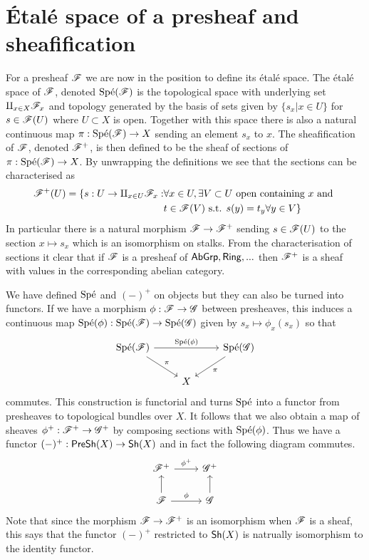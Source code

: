 \documentclass{memoir}
\begin{document}
\section{\'Etal\'e space of a presheaf and sheafification}
For a presheaf $\mathscr{F}$ we are now in the position to define its \'etal\'e space.
The \'etal\'e space of $\mathscr{F}$, denoted $\text{Sp\'e}(\mathscr{F})$ is the topological space with underlying set $\amalg_{x\in X}\mathscr{F}_x$ and topology generated by the basis of sets given by $\{s_x|x\in U\}$ for $s\in \mathscr{F}(U)$ where $U\subset X$ is open.
Together with this space there is also a natural continuous map $\pi:\text{Sp\'e}(\mathscr{F})\to X$ sending an element $s_x$ to $x$.
The sheafification of $\mathscr{F}$, denoted $\mathscr{F}^+$, is then defined to be the sheaf of sections of $\pi:\text{Sp\'e}(\mathscr{F})\to X$.
By unwrapping the definitions we see that the sections can be characterised as
\begin{align}
    \mathscr{F}^+(U) = \{s:U\to\amalg_{x\in U}\mathscr{F}_x : & \forall x\in U, \exists V\subset U \text{ open containing $x$ and } \nonumber \\
                                                            & t\in\mathscr{F}(V) \text{ s.t. }  s(y) = t_y \forall y\in V\}
\end{align}
In particular there is a natural morphism $\mathscr{F} \to \mathscr{F}^+$ sending $s\in \mathscr{F}(U)$ to the section $x\mapsto s_x$ which is an isomorphism on stalks.
From the characterisation of sections it clear that if $\mathscr{F}$ is a presheaf of ${\normalfont\mathsf{AbGrp}},{\normalfont\mathsf{Ring}},...$ then $\mathscr{F}^+$ is a sheaf with values in the corresponding abelian category.

We have defined $\text{Sp\'e}$ and $(-)^+$ on objects but they can also be turned into functors.
If we have a morphism $\phi:\mathscr{F}\to\mathscr{G}$ between presheaves, this induces a continuous map $\text{Sp\'e}(\phi):\text{Sp\'e}(\mathscr{F})\to \text{Sp\'e}(\mathscr{G})$ given by $s_x\mapsto\phi_x(s_x)$ so that 
\begin{equation}
    \begin{tikzcd}
        \Spe(\shf{F}) \arrow[rr, "\Spe(\phi)"] \arrow[rd,"\pi"] & & \Spe(\shf{G}) \arrow[dl,"\pi"] \\
                                              & X &
    \end{tikzcd}
\end{equation}
commutes.
This construction is functorial and turns $\text{Sp\'e}$ into a functor from presheaves to topological bundles over $X$.
It follows that we also obtain a map of sheaves $\phi^+:\mathscr{F}^+\to\mathscr{G}^+$ by composing sections with $\text{Sp\'e}(\phi)$.
Thus we have a functor $(-)^+:{\normalfont\mathsf{PreSh}}(X)\to{\normalfont\mathsf{Sh}}(X)$ and in fact the following diagram commutes.
\begin{equation}
    \label{eq:sheafif}
    \begin{tikzcd}
        \shf{F}^+ \arrow[r,"\phi^+"] & \shf{G}^+ \\
        \shf{F} \arrow[u] \arrow[r,"\phi"] & \shf{G} \arrow[u]
    \end{tikzcd}
\end{equation}
Note that since the morphism $\mathscr{F}\to\mathscr{F}^+$ is an isomorphism when $\mathscr{F}$ is a sheaf, this says that the functor $(-)^+$ restricted to ${\normalfont\mathsf{Sh}}(X)$ is natrually isomorphism to the identity functor.
\end{document}
